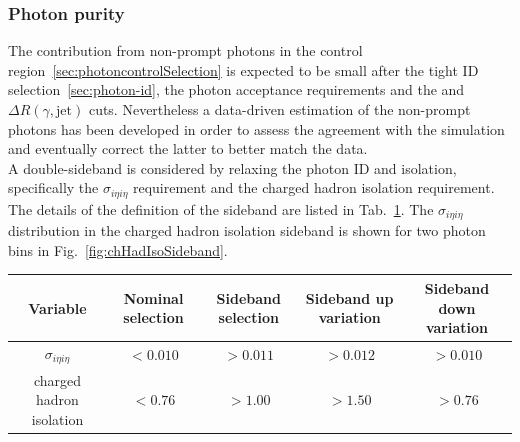 \subsubsection{Photon purity}
\label{sec:photon-purity}
The contribution from non-prompt photons in the \gj control region~\ref{sec:photoncontrolSelection} 
is expected to be small after the tight ID selection~\ref{sec:photon-id}, the photon acceptance requirements 
and the \alphat and $\Delta R (\gamma,\mathrm{jet})$ cuts. 
Nevertheless a data-driven estimation of the non-prompt photons has been developed 
in order to assess the agreement with the simulation and eventually correct the latter 
to better match the data. \\
A double-sideband is considered by relaxing the photon ID and isolation, 
specifically the $\sigma_{i\eta i\eta}$ requirement and the charged hadron isolation requirement. 
The details of the definition of the sideband are listed in Tab.~\ref{tab:phoPurity-sideband}. 
The $\sigma_{i\eta i\eta}$ distribution in the charged hadron isolation sideband is shown for two 
photon \pt bins in Fig.~\ref{fig:chHadIsoSideband}.

\begin{table}[h!]
  \label{tab:phoPurity-sideband}
  \centering
  \footnotesize
  \begin{tabular}{ ccccc }
    \hline
    \hline
    Variable & Nominal selection & Sideband selection & Sideband up variation & Sideband down variation \\
    \hline
    $\sigma_{i\eta i\eta}$   & $<0.010$ & $>0.011$ & $>0.012$ & $>0.010$ \\
    charged hadron isolation & $<0.76$  & $>1.00$  & $>1.50$  & $>0.76$  \\ 
    \hline
    \hline
  \end{tabular}
\end{table}

